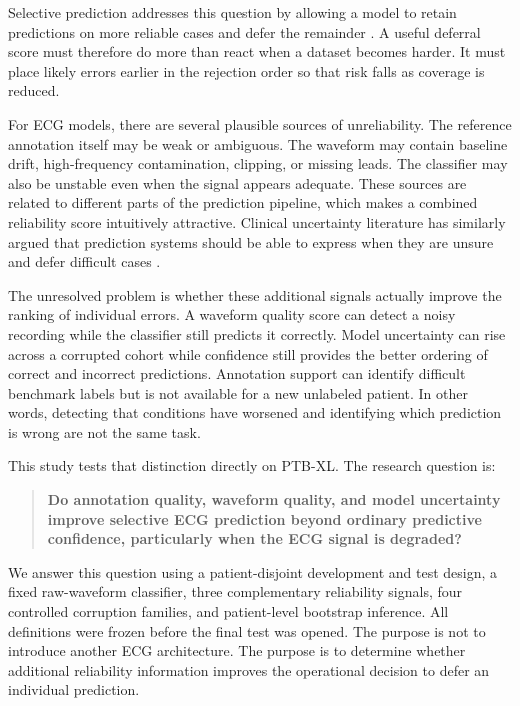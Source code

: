 \documentclass[journal]{IEEEtran}
\begin{document}
Selective prediction addresses this question by allowing a model to retain predictions on more reliable cases and defer the remainder \cite{geifman2017selective,geifman2019selectivenet}. A useful deferral score must therefore do more than react when a dataset becomes harder. It must place likely errors earlier in the rejection order so that risk falls as coverage is reduced.

For ECG models, there are several plausible sources of unreliability. The reference annotation itself may be weak or ambiguous. The waveform may contain baseline drift, high-frequency contamination, clipping, or missing leads. The classifier may also be unstable even when the signal appears adequate. These sources are related to different parts of the prediction pipeline, which makes a combined reliability score intuitively attractive. Clinical uncertainty literature has similarly argued that prediction systems should be able to express when they are unsure and defer difficult cases \cite{kompa2021second,chua2023uncertainty}.

The unresolved problem is whether these additional signals actually improve the ranking of individual errors. A waveform quality score can detect a noisy recording while the classifier still predicts it correctly. Model uncertainty can rise across a corrupted cohort while confidence still provides the better ordering of correct and incorrect predictions. Annotation support can identify difficult benchmark labels but is not available for a new unlabeled patient. In other words, detecting that conditions have worsened and identifying which prediction is wrong are not the same task.

This study tests that distinction directly on PTB-XL. The research question is:

\begin{quote}
\textbf{Do annotation quality, waveform quality, and model uncertainty improve selective ECG prediction beyond ordinary predictive confidence, particularly when the ECG signal is degraded?}
\end{quote}

We answer this question using a patient-disjoint development and test design, a fixed raw-waveform classifier, three complementary reliability signals, four controlled corruption families, and patient-level bootstrap inference. All definitions were frozen before the final test was opened. The purpose is not to introduce another ECG architecture. The purpose is to determine whether additional reliability information improves the operational decision to defer an individual prediction.
\end{document}
